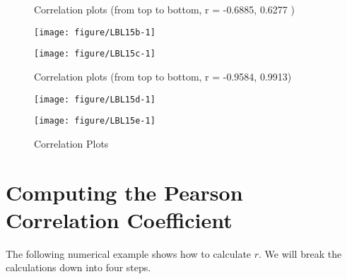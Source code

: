 \documentclass[11pt]{book}\usepackage[]{graphicx}\usepackage[]{color}
\begin{document}
\begin{figure}

\caption{Correlation Plots }

\begin{minipage}[ht]{7.1cm}

Correlation plots (from top to bottom, r = -0.6885, 0.6277 )




{\centering \texttt{[image: figure/LBL15b-1]} 

}





{\centering \texttt{[image: figure/LBL15c-1]} 

}




\end{minipage} \hfill
\begin{minipage}[ht]{7.1cm}


Correlation plots (from top to bottom, r = -0.9584, 0.9913)




{\centering \texttt{[image: figure/LBL15d-1]} 

}





{\centering \texttt{[image: figure/LBL15e-1]} 

}



\end{minipage}

\end{figure}

\section{Computing the Pearson Correlation Coefficient}

The following numerical example shows how to calculate $r$.  We will break the calculations down into four steps.
\end{document}
